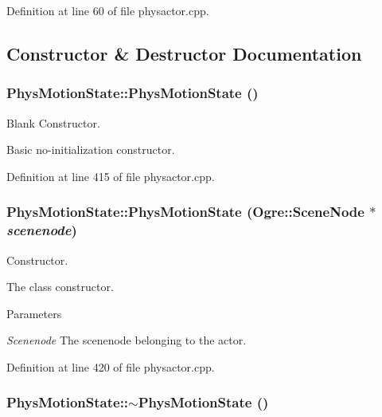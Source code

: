 Definition at line 60 of file physactor.cpp.



\subsection{Constructor \& Destructor Documentation}
\hypertarget{classPhysMotionState_a8439c3835b9d96b0b1b285126df41a42}{
\subsubsection[{PhysMotionState}]{\setlength{\rightskip}{0pt plus 5cm}PhysMotionState::PhysMotionState ()}}
\label{d2/d14/classPhysMotionState_a8439c3835b9d96b0b1b285126df41a42}


Blank Constructor. 

Basic no-\/initialization constructor. 

Definition at line 415 of file physactor.cpp.

\hypertarget{classPhysMotionState_a9c315b85bc405a36a6bd9d9a9f68c34a}{
\subsubsection[{PhysMotionState}]{\setlength{\rightskip}{0pt plus 5cm}PhysMotionState::PhysMotionState (Ogre::SceneNode $\ast$ {\em scenenode})}}
\label{d2/d14/classPhysMotionState_a9c315b85bc405a36a6bd9d9a9f68c34a}


Constructor. 

The class constructor. 
\begin{DoxyParams}{Parameters}
\item[{\em Scenenode}]The scenenode belonging to the actor. \end{DoxyParams}


Definition at line 420 of file physactor.cpp.

\hypertarget{classPhysMotionState_a74441aa0ba9a1b99ee1662b2eee9db3c}{
\subsubsection[{$\sim$PhysMotionState}]{\setlength{\rightskip}{0pt plus 5cm}PhysMotionState::$\sim$PhysMotionState ()}}
\label{d2/d14/classPhysMotionState_a74441aa0ba9a1b99ee1662b2eee9db3c}


